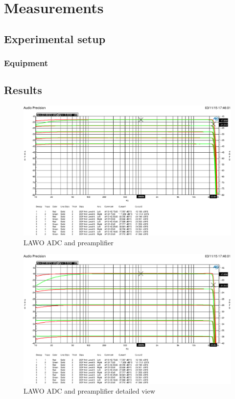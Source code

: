 \documentclass[11pt]{report}
\begin{document}
\section{Measurements}
	\subsection{Experimental setup}
		\subsubsection{Equipment}

	\subsection{Results}
\begin{figure}[htbp]
\begin{center}
\includegraphics[width=14cm,keepaspectratio=true]{LAWOVorverstaerker5u21dB}
\caption{LAWO ADC and preamplifier}
\label{Abb.:1}
\end{center}
\end{figure}

\begin{figure}[htbp]
\begin{center}
\includegraphics[width=14cm,keepaspectratio=true]{LAWOVorverstaerker5u21dBVergleichszoom}
\caption{LAWO ADC and preamplifier detailed view}
\label{Abb.:1}
\end{center}
\end{figure}
\end{document}
